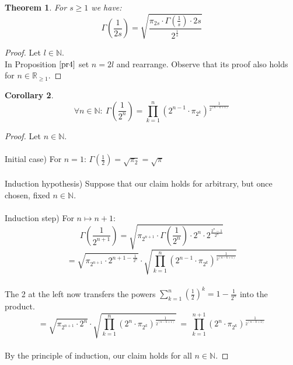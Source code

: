 \documentclass[sn-mathphys]{sn-jnl}%
\theoremstyle{thmstyleone}%
\newtheorem{theorem}{Theorem}%
\newtheorem{corollary}[theorem]{Corollary}
\theoremstyle{thmstyletwo}%
\theoremstyle{thmstylethree}%
\begin{document}
\begin{theorem}\label{th5}
For $s \geq 1$ we have:
\begin{equation}
\Gamma(\frac{1}{2s}) = \sqrt{\frac{\pi_{2s} \cdot \Gamma(\frac{1}{s}) \cdot 2s}{2^{\frac{1}{s}}}}
\end{equation}
\end{theorem}
\begin{proof}
Let $l \in \mathbb{N}$. \\
In Proposition $\ref{pr4}$ set $n = 2l$ and rearrange. Observe that its proof also holds for $n \in \mathbb{R}_{\geq 1}$.
\end{proof}
\begin{corollary}\label{co6}
\begin{equation}
\forall n \in \mathbb{N}: \ \Gamma(\frac{1}{2^{n}}) = \prod_{k=1}^{n} (2^{n-1} \cdot \pi_{2^{k}})^{\frac{1}{2^{(n-k+1)}}}
\end{equation}
\end{corollary}
\begin{proof}
Let $n \in \mathbb{N}$. \\ \\
Initial case) For $n=1$: $\Gamma(\frac{1}{2}) = \sqrt{\pi_2} = \sqrt{\pi}$ \\ \\
Induction hypothesis) Suppose that our claim holds for arbitrary, but once chosen, fixed $n \in \mathbb{N}$. \\ \\
Induction step) For $n \mapsto n+1$: 
\begin{equation*}
\Gamma(\frac{1}{2^{n+1}}) = \sqrt{\pi_{2^{n+1}} \cdot \Gamma(\frac{1}{2^n}) \cdot 2^n \cdot 2^{\frac{2^n - 1}{2^n}}}
\end{equation*}
\begin{equation*}
= \sqrt{\pi_{2^{n+1}} \cdot 2^{n+1 - \frac{1}{2^n}}} \cdot \sqrt{\prod_{k=1}^{n} (2^{n-1} \cdot \pi_{2^{k}})^{\frac{1}{2^{(n-k+1)}}}}
\end{equation*} \\
The 2 at the left now transfers the powers $\sum_{k=1}^{n} (\frac{1}{2})^k = 1 - \frac{1}{2^n}$ into the product. \\
\begin{equation*}
= \sqrt{\pi_{2^{n+1}} \cdot 2^{n}} \cdot \sqrt{\prod_{k=1}^{n} (2^{n} \cdot \pi_{2^{k}})^{\frac{1}{2^{(n-k+1)}}}} \ = \ \prod_{k=1}^{n+1} (2^{n} \cdot \pi_{2^{k}})^{\frac{1}{2^{(n-k+2)}}}
\end{equation*} \\
By the principle of induction, our claim holds for all $n \in \mathbb{N}$.
\end{proof}
\end{document}
